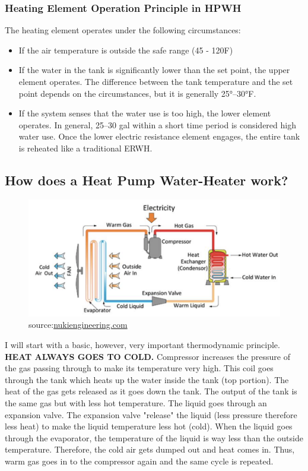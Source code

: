 \subsubsection{Heating Element Operation Principle in HPWH}
The heating element operates under the following circumstances:
\begin{itemize}
    \item If the air temperature is outside the safe range (45 - 120F)
    \item If the water in the tank is significantly lower than the set point, the upper element operates. The difference between the tank temperature and the set point depends on the circumstances, but it is generally 25°–30°F.
    \item If the system senses that the water use is too high, the lower element operates. In general, 25–30 gal within a short time period is considered high water use. Once the lower electric resistance element engages, the entire tank is reheated like a traditional ERWH.
\end{itemize}
\newpage
\subsection{How does a Heat Pump Water-Heater work?}
    \begin{figure}[htp!]
        \centering
        \includegraphics[width=1.1\columnwidth]{Pictures/HPWH_working_principle.png}
        \caption{source:\href{https://inukiengineering.com/heat-pump-water-heaters/}{nukiengineering.com}}
        \label{fig:EWH2}
    \end{figure}
I will start with a basic, however, very important thermodynamic principle. \textbf{HEAT ALWAYS GOES TO COLD.} Compressor increases the pressure of the gas passing through to make its temperature very high. This coil goes through the tank which heats up the water inside the tank (top portion). The heat of the gas gets released as it goes down the tank. The output of the tank is the same gas but with less hot temperature. The liquid goes through an expansion valve. The expansion valve "release" the liquid (less pressure therefore less heat) to make the liquid temperature less hot (cold). When the liquid goes through the evaporator, the temperature of the liquid is way less than the outside temperature. Therefore, the cold air gets dumped out and heat comes in. Thus, warm gas goes in to the compressor again and the same cycle is repeated.
